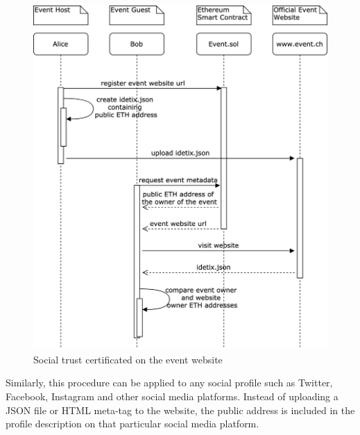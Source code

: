 \begin{figure}[H]
    \centering
    \includegraphics[width=14cm]{figures/social-trust-certificates.png}
    \caption{Social trust certificated on the event website}
    \label{fig:trust-certificate-event-website}
\end{figure}

Similarly, this procedure can be applied to any social profile such as Twitter, Facebook, Instagram and other social media platforms. Instead of uploading a JSON file or HTML meta-tag to the website, the public address is included in the profile description on that particular social media platform. 